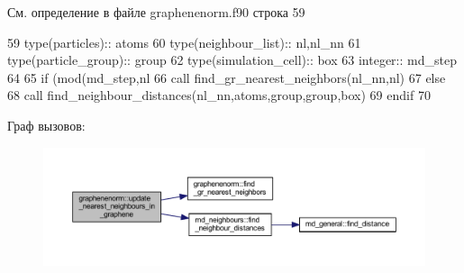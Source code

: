 См. определение в файле graphenenorm.\+f90 строка 59


\begin{DoxyCode}
59     \textcolor{keywordtype}{type}(particles)::   atoms
60     \textcolor{keywordtype}{type}(neighbour\_list):: nl,nl\_nn
61     \textcolor{keywordtype}{type}(particle\_group):: group
62     \textcolor{keywordtype}{type}(simulation\_cell):: box
63     \textcolor{keywordtype}{integer}:: md\_step
64 
65     \textcolor{keywordflow}{if} (mod(md\_step,nl%
66         \textcolor{keyword}{call }find\_gr\_nearest\_neighbors(nl\_nn,nl)
67     \textcolor{keywordflow}{else}
68         \textcolor{keyword}{call }find\_neighbour\_distances(nl\_nn,atoms,group,group,box)
69 \textcolor{keywordflow}{    endif}
70     
\end{DoxyCode}
Граф вызовов\+:\nopagebreak
\begin{figure}[H]
\begin{center}
\leavevmode
\includegraphics[width=350pt]{namespacegraphenenorm_a16d22fddd4c9f90cdf1236130515fd24_cgraph}
\end{center}
\end{figure}
